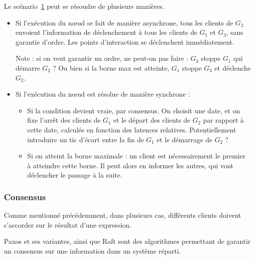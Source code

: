 \documentclass{article}
\newcommand\triggers{points d'interaction\xspace}
\begin{document}
\begin{figure}[h]
    \centering
    \begin{tikzpicture}
    
    \end{tikzpicture}
    \label{scenar.trigger-1}
\end{figure}

Le scénario~\ref{scenar.trigger-1} peut se résoudre de plusieurs manières.

\begin{itemize}
    \item Si l'exécution du nœud se fait de manière asynchrone, tous les clients de $G_2$ envoient l'information de déclenchement à tous les clients de $G_1$ et $G_3$, sans garantie d'ordre.
    Les \triggers se déclenchent immédiatement.
    
    Note : si on veut garantir un ordre, ne peut-on pas faire : $G_3$ stoppe $G_1$ qui démarre $G_2$ ? Ou bien si la borne max est atteinte, $G_1$ stoppe $G_3$ et déclenche $G_2$.
    
    \item Si l'exécution du nœud est résolue de manière synchrone : 
    \begin{itemize}
        \item Si la condition devient vraie, par consensus. 
        On choisit une date, et on fixe l'arrêt des clients de $G_1$ et le départ des clients de $G_2$ par rapport à cette date, calculée en fonction des latences relatives. 
        Potentiellement introduire un tic d'écart entre la fin de $G_1$ et le démarrage de $G_2$ ?
        \item Si on atteint la borne maximale : un client est nécessairement le premier à atteindre cette borne.
        Il peut alors en informer les autres, qui vont déclencher le passage à la suite.
    \end{itemize}
\end{itemize}

\subsubsection{Consensus}\label{section.consensus}
Comme mentionné précédemment, dans plusieurs cas, différents clients doivent s'accorder sur le résultat d'une expression.

Paxos et ses variantes\cite{lamport1998part}, ainsi que Raft\cite{ongaro2014search} sont des algorithmes permettant de garantir un consensus sur une information dans un système réparti. 
\end{document}
